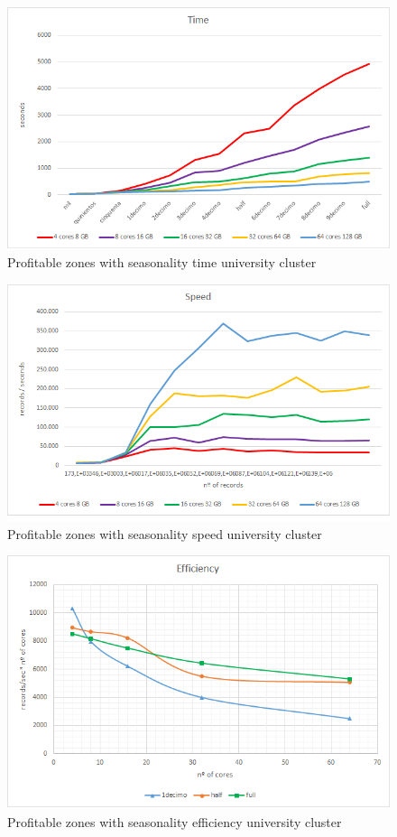 \begin{figure}[htp!]
	\centering
	\caption{Profitable zones with seasonality time university cluster}
	\label{tpdu}
	\vspace{5pt}
	\includegraphics[scale=0.8]{geng/tpdu}
\end{figure}
\begin{figure}[htp!]
	\centering
	\caption{Profitable zones with seasonality speed university cluster}
	\label{spdu}
	\vspace{5pt}
	\includegraphics[scale=0.85]{geng/spdu}
\end{figure}
\begin{figure}[htp!]
	\centering
	\caption{Profitable zones with seasonality efficiency university cluster}
	\label{epdu}
	\vspace{5pt}
	\includegraphics[scale=0.85]{geng/epdu}
\end{figure}